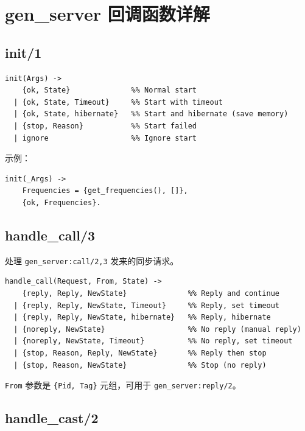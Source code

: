 \documentclass[a4paper,11pt]{article}
\begin{document}
\section{gen\_server 回调函数详解}

\subsection{init/1}

\begin{lstlisting}[style=erlangstyle, caption={init/1 返回值}]
init(Args) ->
    {ok, State}              %% Normal start
  | {ok, State, Timeout}     %% Start with timeout
  | {ok, State, hibernate}   %% Start and hibernate (save memory)
  | {stop, Reason}           %% Start failed
  | ignore                   %% Ignore start
\end{lstlisting}

示例：
\begin{lstlisting}[style=erlangstyle]
init(_Args) ->
    Frequencies = {get_frequencies(), []},
    {ok, Frequencies}.
\end{lstlisting}

\subsection{handle\_call/3}

处理 \texttt{gen\_server:call/2,3} 发来的同步请求。

\begin{lstlisting}[style=erlangstyle, caption={handle\_call/3 返回值}]
handle_call(Request, From, State) ->
    {reply, Reply, NewState}              %% Reply and continue
  | {reply, Reply, NewState, Timeout}     %% Reply, set timeout
  | {reply, Reply, NewState, hibernate}   %% Reply, hibernate
  | {noreply, NewState}                   %% No reply (manual reply)
  | {noreply, NewState, Timeout}          %% No reply, set timeout
  | {stop, Reason, Reply, NewState}       %% Reply then stop
  | {stop, Reason, NewState}              %% Stop (no reply)
\end{lstlisting}

\texttt{From} 参数是 \texttt{\{Pid, Tag\}} 元组，可用于 \texttt{gen\_server:reply/2}。

\subsection{handle\_cast/2}
\end{document}
